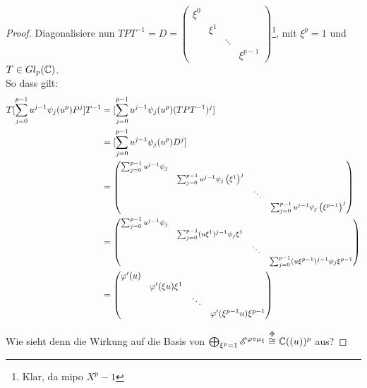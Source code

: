 \begin{proof}
Diagonalisiere nun $TPT^{-1}=D=\begin{pmatrix}\xi^{0}\\
 & \xi^{1}\\
 &  & \ddots\\
 &  &  & \xi^{p-1}
\end{pmatrix}$\footnote{Klar, da mipo $X^p-1$}, mit $\xi^p=1$ und
$T\in Gl_p(\C)$.\\
So dass gilt:\\
\begin{align*}
  T[\sum_{j=0}^{p-1}u^{j-1}\psi_j(u^p)P^j]T^{-1} &=
    [\sum_{j=0}^{p-1}u^{j-1}\psi_j(u^p) (TPT^{-1})^j]\\
  &= [\sum_{j=0}^{p-1}u^{j-1}\psi_j(u^p)D^j]\\
  &= 
{
  \footnotesize
  \begin{pmatrix}\sum_{j=0}^{p-1}u^{j-1}\psi_{j}\\
    & \sum_{j=0}^{p-1}u^{j-1}\psi_{j}\left(\xi^{1}\right)^{j}\\
    & & \ddots\\
    &  &  & \sum_{j=0}^{p-1}u^{j-1}\psi_{j}\left(\xi^{p-1}\right)^{j}
  \end{pmatrix}
}\\
  &= 
{
  \footnotesize
  \begin{pmatrix}\sum_{j=0}^{p-1}u^{j-1}\psi_{j}\\
    & \sum_{j=0}^{p-1}(u\xi^1)^{j-1}\psi_{j}\xi^{1}\\
    & & \ddots\\
    &  &  & \sum_{j=0}^{p-1}(u\xi^{p-1})^{j-1}\psi_{j}\xi^{p-1}
  \end{pmatrix} 
}\\
  &= \begin{pmatrix}\phi'(u)\\
    & \phi'(\xi u)\xi^{1}\\
    & & \ddots\\
    &  &  & \phi'(\xi^{p-1} u)\xi^{p-1}
  \end{pmatrix}\\
\end{align*}

Wie sieht denn die Wirkung auf die Basis von
$\bigoplus_{\xi^p=1}\sE^{\phi\circ\mu_\xi}\overset{\Phi}{\cong}\C((u))^p$ aus?


\end{proof}
